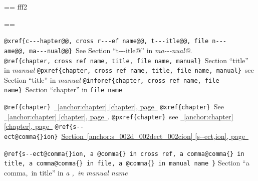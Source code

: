 \documentclass{book}
\makeatletter
\newenvironment{Texinfopreformatted}{%
  \par\GNUTobeylines\obeyspaces\frenchspacing\parskip=\z@\parindent=\z@}{}
{\catcode`\^^M=13 \gdef\GNUTobeylines{\catcode`\^^M=13 \def^^M{\null\par}}}
\newenvironment{Texinfoindented}{\begin{list}{}{}\item\relax}{\end{list}}
\renewcommand{\_}{\Texinfounderscore\discretionary{}{}{}}
\makeatother
\begin{document}
{{\begin{Texinfoindented}
%
\begin{Texinfoindented}
\unskip{\parskip=0pt\noindent}%
\begin{Texinfopreformatted}%
\ttfamily fff2
\end{Texinfopreformatted}
\end{Texinfoindented}
\begin{Texinfopreformatted}%
\ttfamily 

\texttt{@xref\{c{-}{-}{-}hapter@@,\ cross r{-}{-}{-}ef name@@,\ t{-}{-}{-}itle@@,\ file n{-}{-}{-}ame@@,\ ma{-}{-}{-}nual@@\}}\ See Section ``t{-}{-}{-}itle@'' in \textsl{ma{-}{-}{-}nual@}.
\texttt{@ref\{chapter,\ cross ref name,\ title,\ file name,\ manual\}}\ Section ``title'' in \textsl{manual}
\texttt{@pxref\{chapter,\ cross ref name,\ title,\ file name,\ manual\}}\ see Section ``title'' in \textsl{manual}
\texttt{@inforef\{chapter,\ cross ref name,\ file name\}}\ Section ``chapter'' in \texttt{file name}

\texttt{@ref\{chapter\}}\ \hyperref[anchor:chapter]{\chaptername~\ref*{anchor:chapter} [chapter], page~\pageref*{anchor:chapter}}
\texttt{@xref\{chapter\}}\ See \hyperref[anchor:chapter]{\chaptername~\ref*{anchor:chapter} [chapter], page~\pageref*{anchor:chapter}}.
\texttt{@pxref\{chapter\}}\ see \hyperref[anchor:chapter]{\chaptername~\ref*{anchor:chapter} [chapter], page~\pageref*{anchor:chapter}}
\texttt{@ref\{s{-}{-}ect@comma\{\}ion\}}\ \hyperref[anchor:s_002d_002dect_002cion]{Section~\ref*{anchor:s_002d_002dect_002cion} [s{-}{-}ect,ion], page~\pageref*{anchor:s_002d_002dect_002cion}}

\texttt{@ref\{s{-}{-}ect@comma\{\}ion,\ a @comma\{\}\ in cross
ref,\ a comma@comma\{\}\ in title,\ a comma@comma\{\}\ in file,\ a @comma\{\}\ in manual name \}}
Section ``a comma,\ in title'' in \textsl{a ,\ in manual name}


\end{Texinfopreformatted}
\end{Texinfoindented}}}
\end{document}

